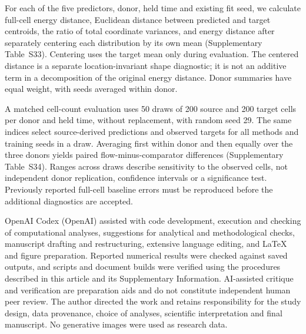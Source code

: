 \documentclass[10pt,a4paper]{article}
\begin{document}
For each of the five predictors, donor, held time and existing fit seed, we calculate full-cell energy distance, Euclidean distance between predicted and target centroids, the ratio of total coordinate variances, and energy distance after separately centering each distribution by its own mean (Supplementary Table~S33). Centering uses the target mean only during evaluation. The centered distance is a separate location-invariant shape diagnostic; it is not an additive term in a decomposition of the original energy distance. Donor summaries have equal weight, with seeds averaged within donor.

A matched cell-count evaluation uses 50 draws of 200 source and 200 target cells per donor and held time, without replacement, with random seed 29. The same indices select source-derived predictions and observed targets for all methods and training seeds in a draw. Averaging first within donor and then equally over the three donors yields paired flow-minus-comparator differences (Supplementary Table~S34). Ranges across draws describe sensitivity to the observed cells, not independent donor replication, confidence intervals or a significance test. Previously reported full-cell baseline errors must be reproduced before the additional diagnostics are accepted.



OpenAI Codex (OpenAI) assisted with code development, execution and checking of computational analyses, suggestions for analytical and methodological checks, manuscript drafting and restructuring, extensive language editing, and LaTeX and figure preparation. Reported numerical results were checked against saved outputs, and scripts and document builds were verified using the procedures described in this article and its Supplementary Information. AI-assisted critique and verification are preparation aids and do not constitute independent human peer review. The author directed the work and retains responsibility for the study design, data provenance, choice of analyses, scientific interpretation and final manuscript. No generative images were used as research data.



\endgroup
\end{document}
